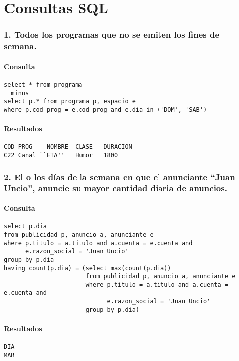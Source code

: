\section{Consultas SQL}

\subsubsection*{1. Todos los programas que no se emiten los fines de semana.}

\paragraph{Consulta}
\begin{verbatim} 
select * from programa
  minus
select p.* from programa p, espacio e
where p.cod_prog = e.cod_prog and e.dia in ('DOM', 'SAB')
\end{verbatim}

\paragraph{Resultados}
\begin{verbatim} 
COD_PROG	NOMBRE	CLASE	DURACION
C22	Canal ``ETA''	Humor	1800
\end{verbatim} 

\subsubsection*{2. El o los d\'ias de la semana en que el anunciante ``Juan Uncio'', anuncie su mayor cantidad diaria de anuncios.}

\paragraph{Consulta}
\begin{verbatim}
select p.dia 
from publicidad p, anuncio a, anunciante e
where p.titulo = a.titulo and a.cuenta = e.cuenta and 
      e.razon_social = 'Juan Uncio'
group by p.dia
having count(p.dia) = (select max(count(p.dia))
                       from publicidad p, anuncio a, anunciante e
                       where p.titulo = a.titulo and a.cuenta = e.cuenta and
                             e.razon_social = 'Juan Uncio'
                       group by p.dia)
\end{verbatim}

\paragraph{Resultados}
\begin{verbatim} 
DIA
MAR
\end{verbatim} 

